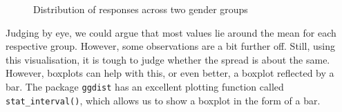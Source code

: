 \documentclass[
  letterpaper,
  DIV=11,
  numbers=noendperiod]{scrreprt}
\newenvironment{Shaded}{\begin{snugshade}}{\end{snugshade}}
\newcommand{\AttributeTok}[1]{\textcolor[rgb]{0.40,0.45,0.13}{#1}}
\newcommand{\DecValTok}[1]{\textcolor[rgb]{0.68,0.00,0.00}{#1}}
\newcommand{\FloatTok}[1]{\textcolor[rgb]{0.68,0.00,0.00}{#1}}
\newcommand{\FunctionTok}[1]{\textcolor[rgb]{0.28,0.35,0.67}{#1}}
\newcommand{\NormalTok}[1]{\textcolor[rgb]{0.00,0.23,0.31}{#1}}
\newcommand{\SpecialCharTok}[1]{\textcolor[rgb]{0.37,0.37,0.37}{#1}}
\newcommand{\StringTok}[1]{\textcolor[rgb]{0.13,0.47,0.30}{#1}}
\begin{document}
\begin{Shaded}
\end{Shaded}

\begin{figure}


\caption{\label{fig-homogeneity-variance}Distribution of responses
across two gender groups}

\end{figure}%

Judging by eye, we could argue that most values lie around the mean for
each respective group. However, some observations are a bit further off.
Still, using this visualisation, it is tough to judge whether the spread
is about the same. However, boxplots can help with this, or even better,
a boxplot reflected by a bar. The package \texttt{ggdist} has an
excellent plotting function called \texttt{stat\_interval()}, which
allows us to show a boxplot in the form of a bar.
\end{document}
